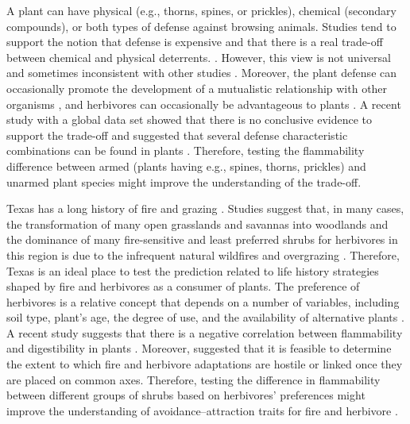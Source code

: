\documentclass{ttuthes2007}
\begin{document}
A plant can have physical (e.g., thorns, spines, or prickles), chemical (secondary compounds), or both types of defense against browsing animals. Studies tend to support the notion that defense is expensive and that there is a real trade-off between chemical and physical deterrents. \citep{rhoades1979evolution, van1988defence,twigg1996physicalchemical}. However, this view is not universal and sometimes inconsistent with other studies \citep{iddles2003potentialnegativecorrelation,steward1988theredifferentview,koricheva2004metanegativecorrelation}. Moreover, the plant defense can occasionally promote the development of a mutualistic relationship with other organisms \citep{janzen1966coevolution}, and herbivores can occasionally be advantageous to plants \citep{belsky1986does}. A recent study with a global data set showed that there is no conclusive evidence to support the trade-off and suggested that several defense characteristic combinations can be found in plants \citep{moles2013correlations}. Therefore, testing the flammability difference between armed (plants having e.g., spines, thorns, prickles) and unarmed plant species might improve the understanding of the trade-off.

Texas has a long history of fire \citep{moir1982firehistory, stambaugh2011firehistory,stambaugh2014historicalfirehistory,smeins2005historyoffire1} and grazing \citep{buechner1950lifegrazing, wilcox2012historicalgrazing2}. Studies suggest that, in many cases, the transformation of many open grasslands and savannas into woodlands and the dominance of many fire-sensitive and least preferred shrubs for herbivores in this region is due to the infrequent natural wildfires and overgrazing \citep{archer1989havejoint,andruk2014joint, masters1986prescribed}. Therefore, Texas is an ideal place to test the prediction related to life history strategies shaped by fire and herbivores as a consumer of plants. The preference of herbivores is a relative concept that depends on a number of variables, including soil type, plant's age, the degree of use, and the availability of alternative plants \citep{wright2003white}.  A recent study suggests that there is a negative correlation between flammability and digestibility in plants \citep{gowda2022digestibility}. Moreover, \citep{archibald2019unified} suggested that it is feasible to determine the extent to which fire and herbivore adaptations are hostile or linked once they are placed on common axes. Therefore, testing the difference in flammability between different groups of shrubs based on herbivores' preferences might improve the understanding of avoidance–attraction traits for fire and herbivore \citep{schwilk2003flammability, archibald2019unified}. 
\end{document}
